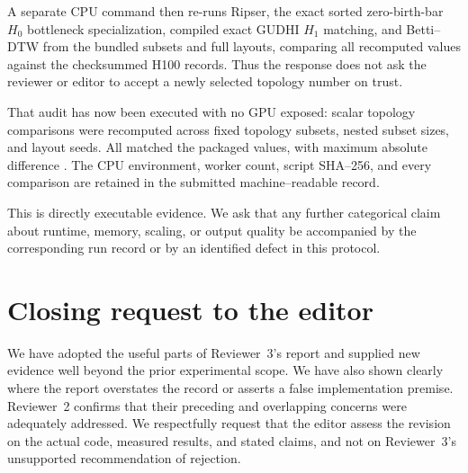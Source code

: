 \documentclass[11pt]{article}
\begin{document}
A separate CPU command then re-runs Ripser, the exact sorted zero-birth-bar
$H_0$ bottleneck specialization, compiled exact GUDHI $H_1$ matching, and
Betti--DTW from the bundled subsets and full layouts, comparing all
recomputed values against the checksummed H100 records. Thus the response does
not ask the reviewer or editor to accept a newly selected topology number on
trust.

That audit has now been executed with no GPU exposed:
\TopologyAuditComparisonCount{} scalar topology
comparisons were recomputed across fixed topology subsets, nested subset sizes, and
layout seeds. All \TopologyAuditComparisonCount{} matched the packaged values,
with maximum absolute difference \TopologyAuditMaximumAbsoluteDelta{}. The CPU environment, worker count, script SHA--256, and every
comparison are retained in the submitted machine--readable record.

This is directly executable evidence. We ask that any further categorical
claim about runtime, memory, scaling, or output quality be accompanied by the
corresponding run record or by an identified defect in this protocol.

\section*{Closing request to the editor}

We have adopted the useful parts of Reviewer~3's report and supplied new
evidence well beyond the prior experimental scope. We have also shown clearly
where the report overstates the record or asserts a false implementation
premise. Reviewer~2 confirms that their preceding and overlapping concerns were
adequately addressed. We respectfully request that the editor assess the
revision on the actual code, measured results, and stated claims, and not on
Reviewer~3's unsupported recommendation of rejection.
\end{document}
